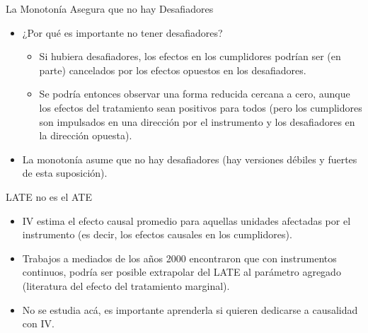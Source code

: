 \documentclass{beamer}
\begin{document}
\begin{frame}{La Monotonía Asegura que no hay Desafiadores}
	
	\begin{itemize}
	\item ¿Por qué es importante no tener desafiadores?
		\begin{itemize}
		\item Si hubiera desafiadores, los efectos en los cumplidores podrían ser (en parte) cancelados por los efectos opuestos en los desafiadores.
		\item Se podría entonces observar una forma reducida cercana a cero, aunque los efectos del tratamiento sean positivos para todos (pero los cumplidores son impulsados en una dirección por el instrumento y los desafiadores en la dirección opuesta).
		\end{itemize}
	\item La monotonía asume que no hay desafiadores (hay versiones débiles y fuertes de esta suposición).
	\end{itemize}

\end{frame}

\begin{frame}{LATE no es el ATE}
	
	\begin{itemize}
	\item IV estima el efecto causal promedio para aquellas unidades afectadas por el instrumento (es decir, los efectos causales en los cumplidores).
	\item Trabajos a mediados de los años 2000 encontraron que con instrumentos continuos, podría ser posible extrapolar del LATE al parámetro agregado (literatura del efecto del tratamiento marginal).
	\item No se estudia acá, es importante aprenderla si quieren dedicarse a causalidad con IV.
	\end{itemize}

\end{frame}
\end{document}
